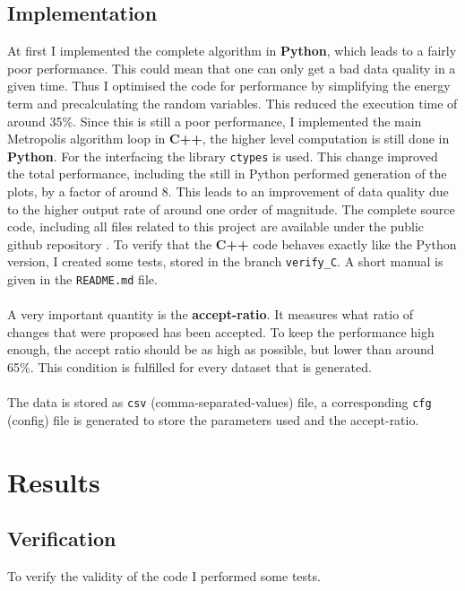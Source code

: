 \documentclass{scrartcl}
\begin{document}
	\subsection{Implementation}
		At first I implemented the complete algorithm in \textbf{Python}, which leads to a fairly poor performance.
		This could mean that one can only get a bad data quality in a given time.
		Thus I optimised the code for performance by simplifying the energy term and precalculating the random variables.
		This reduced the execution time of around 35\%.
		Since this is still a poor performance, I implemented the main Metropolis algorithm loop in \textbf{C++}, the higher level computation is still done in \textbf{Python}.
		For the interfacing the library \verb!ctypes! is used.
		This change improved the total performance, including the still in Python performed generation of the plots, by a factor of around 8.
		This leads to an improvement of data quality due to the higher output rate of around one order of magnitude.
		The complete source code, including all files related to this project are available under the public github repository \cite{github}.
		To verify that the \textbf{C++} code behaves exactly like the Python version, I created some tests, stored in the branch \verb!verify_C!.
		A short manual is given in the \verb!README.md! file.
		\\\\
		A very important quantity is the \textbf{accept-ratio}.
		It measures what ratio of changes that were proposed has been accepted.
		To keep the performance high enough, the accept ratio should be as high as possible, but lower than around 65\%.
		This condition is fulfilled for every dataset that is generated.
		\\\\
		The data is stored as \verb!csv! (comma-separated-values) file, a corresponding \verb!cfg! (config) file is generated to store the parameters used and the accept-ratio.

	\section{Results}
	\subsection{Verification}
		To verify the validity of the code I performed some tests.
\end{document}
